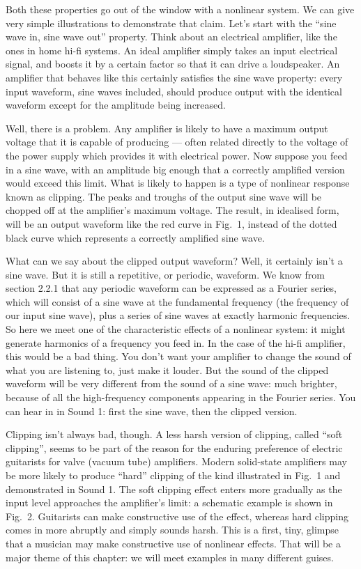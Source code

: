   Both these properties go out of the window with a nonlinear system. We can 
  give very simple illustrations to demonstrate that claim. Let’s start with 
  the “sine wave in, sine wave out” property. Think about an electrical 
  amplifier, like the ones in home hi-fi systems. An ideal amplifier simply 
  takes an input electrical signal, and boosts it by a certain factor so that 
  it can drive a loudspeaker. An amplifier that behaves like this certainly 
  satisfies the sine wave property: every input waveform, sine waves included, 
  should produce output with the identical waveform except for the amplitude 
  being increased. 

  Well, there is a problem. Any amplifier is likely to have a maximum output 
  voltage that it is capable of producing — often related directly to the 
  voltage of the power supply which provides it with electrical power. Now 
  suppose you feed in a sine wave, with an amplitude big enough that a 
  correctly amplified version would exceed this limit. What is likely to happen 
  is a type of nonlinear response known as clipping. The peaks and troughs of 
  the output sine wave will be chopped off at the amplifier’s maximum voltage. 
  The result, in idealised form, will be an output waveform like the red curve 
  in Fig.\ 1, instead of the dotted black curve which represents a correctly 
  amplified sine wave. 

  What can we say about the clipped output waveform? Well, it certainly isn’t a 
  sine wave. But it is still a repetitive, or periodic, waveform. We know from 
  section 2.2.1 that any periodic waveform can be expressed as a Fourier 
  series, which will consist of a sine wave at the fundamental frequency (the 
  frequency of our input sine wave), plus a series of sine waves at exactly 
  harmonic frequencies. So here we meet one of the characteristic effects of a 
  nonlinear system: it might generate harmonics of a frequency you feed in. In 
  the case of the hi-fi amplifier, this would be a bad thing. You don’t want 
  your amplifier to change the sound of what you are listening to, just make it 
  louder. But the sound of the clipped waveform will be very different from the 
  sound of a sine wave: much brighter, because of all the high-frequency 
  components appearing in the Fourier series. You can hear in in Sound 1: first 
  the sine wave, then the clipped version. 

  Clipping isn’t always bad, though. A less harsh version of clipping, called 
  “soft clipping”, seems to be part of the reason for the enduring preference 
  of electric guitarists for valve (vacuum tube) amplifiers. Modern solid-state 
  amplifiers may be more likely to produce “hard” clipping of the kind 
  illustrated in Fig.\ 1 and demonstrated in Sound 1. The soft clipping effect 
  enters more gradually as the input level approaches the amplifier's limit: a 
  schematic example is shown in Fig.\ 2. Guitarists can make constructive use 
  of the effect, whereas hard clipping comes in more abruptly and simply sounds 
  harsh. This is a first, tiny, glimpse that a musician may make constructive 
  use of nonlinear effects. That will be a major theme of this chapter: we will 
  meet examples in many different guises. 

